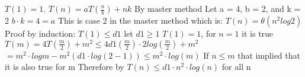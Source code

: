 \documentclass[11pt]{article}
\begin{document}
$T(1)=1$.
\newline
\newline
\newline
$T(n) = aT(\frac{n}{b}) + nk$
\newline
By master method
\newline
Let a = 4, b = 2, and k = 2
\newline
$b \cdot k = 4 = a$
\newline
This is case 2 in the master method which is:
\newline
\newline
$T(n) = \theta (n^2log2)$
\newline
\newline
Proof by induction:
\newline
\newline
$T(1) \leq d1$ let $d1 \geq 1$
\newline
$T(1) = 1$, for $n = 1$ it is true
\newline
\newline
$T(m) = 4T(\frac{m}{2}) + m^2 \leq 4d1(\frac{m}{2}) \cdot 2log(\frac{m}{2}) + m^2$
\newline
$= m^2 \cdot logm - m^2(d1 \cdot log(2-1)) \leq m^2 \cdot log(m)$
\newline
If $n \leq m$ that implied that it is also true for m
\newline
\newline
Therefore by $T(n) \leq d1 \cdot n^2 \cdot log(n)$ for all n


%
\end{document}
